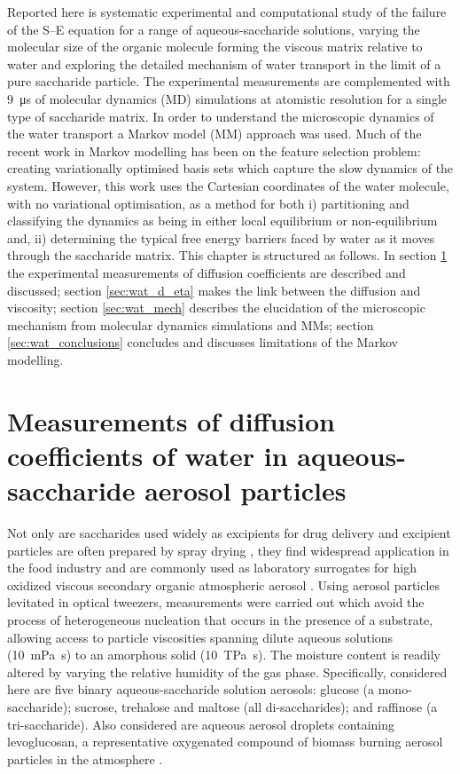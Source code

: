 Reported here is systematic experimental and computational study of the failure of the S–E equation for a range of aqueous-saccharide solutions, varying the molecular size of the organic molecule forming the viscous matrix relative to water and exploring the detailed mechanism of water transport in the limit of a pure saccharide particle. The experimental measurements are complemented with \SI{9}{\micro\second} of molecular dynamics (MD) simulations at atomistic resolution for a single type of saccharide matrix.  In order to understand the microscopic dynamics of the water transport a Markov model (MM) approach was used. Much of the recent work \cite{schererVariationalSelectionFeatures2019,husicMarkovStateModels2018} in Markov modelling has been on the feature selection problem: creating variationally optimised basis sets which capture the slow dynamics of the system. However, this work uses the Cartesian coordinates of the water molecule, with no variational optimisation, as a method for both i) partitioning and classifying the dynamics as being in either local equilibrium or non-equilibrium and, ii) determining the typical free energy barriers faced by water as it moves through the saccharide matrix. This chapter is structured as follows. In section \ref{sec:wat_d_coefs} the experimental measurements of diffusion coefficients are described and discussed; section \ref{sec:wat_d_eta} makes the link  between the diffusion and viscosity; section \ref{sec:wat_mech} describes the elucidation of the microscopic mechanism from molecular dynamics simulations and MMs; section \ref{sec:wat_conclusions} concludes and discusses limitations of the Markov modelling. 

\section{Measurements of diffusion coefficients of water in aqueous-saccharide aerosol particles}\label{sec:wat_d_coefs}

Not only are saccharides used widely as excipients for drug delivery \cite{Zhao2009,Sinha2001,Sastry2000} and excipient particles are often prepared by spray drying \cite{Andya1999,Vehring2008,Mosen2004}, they find widespread application in the food industry and are commonly used as laboratory surrogates for high oxidized viscous secondary organic atmospheric aerosol \cite{Koop2011,Bones2012,Liu2006,Zobrist2008,Reid2018,Song2016a}. Using aerosol particles levitated in optical tweezers, measurements were  carried out  which avoid the process of heterogeneous nucleation that occurs in the presence of a substrate, allowing access to particle viscosities spanning dilute aqueous solutions (\SI{10}{\milli\pascal\second}) to an amorphous solid (\SI{10}{\tera\pascal\second}). The moisture content is readily altered by varying the relative humidity of the gas phase. Specifically, considered here are five binary aqueous-saccharide solution aerosols: glucose (a mono-saccharide); sucrose, trehalose and maltose (all di-saccharides); and raffinose (a tri-saccharide). Also considered are aqueous aerosol droplets containing levoglucosan, a representative oxygenated compound of biomass burning aerosol particles in the atmosphere \cite{Decesari2006}.

